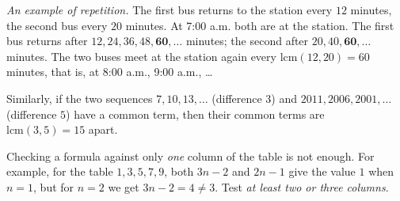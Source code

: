 \documentclass[11pt]{article}
\newenvironment{figC}{\par\vspace{2pt}\begin{center}\begin{tikzpicture}[font=\sffamily\small,>=stealth,line join=round]}%
  {\end{tikzpicture}\end{center}\vspace{1pt}}
\begin{document}
\begin{tipbox}
\emph{An example of repetition.} The first bus returns to the station every $12$ minutes, the second bus every $20$ minutes. At 7:00 a.m. both are at the station.
The first bus returns after $12, 24, 36, 48, \mathbf{60},\dots$ minutes; the second after $20, 40, \mathbf{60},\dots$ minutes.
The two buses meet at the station again every $\text{lcm}(12,20)=60$ minutes, that is, at 8:00 a.m., 9:00 a.m., \dots

Similarly, if the two sequences $7,10,13,\dots$ (difference $3$) and $2011,2006,2001,\dots$ (difference $5$) have a common term, then their common terms are $\text{lcm}(3,5)=15$ apart.
\end{tipbox}


\begin{warnbox}
Checking a formula against only \emph{one} column of the table is not enough. For example, for the table $1,3,5,7,9$, both $3n-2$ and $2n-1$
give the value $1$ when $n=1$, but for $n=2$ we get $3n-2=4\neq 3$. Test \emph{at least two or three columns}.
\end{warnbox}
\end{document}
